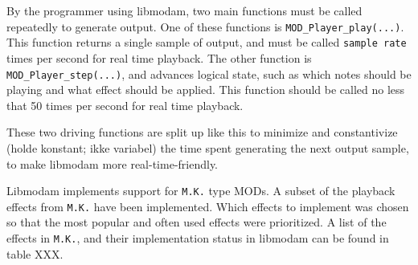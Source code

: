 By the programmer using libmodam, two main functions must be called repeatedly to generate output.
One of these functions is \texttt{MOD\_Player\_play(...)}.
This function returns a single sample of output, and must be called \texttt{sample rate} times per second for real time playback.
The other function is \texttt{MOD\_Player\_step(...)}, and advances logical state, such as which notes should be playing and what effect should be applied.
This function should be called no less that 50 times per second for real time playback.

These two driving functions are split up like this to minimize and constantivize (holde konstant; ikke variabel) the time spent generating the next output sample, to make libmodam more real-time-friendly.

Libmodam implements support for \texttt{M.K.} type MODs.
A subset of the playback effects from \texttt{M.K.} have been implemented.
Which effects to implement was chosen so that the most popular and often used effects were prioritized.
A list of the effects in \texttt{M.K.}, and their implementation status in libmodam can be found in table XXX.
